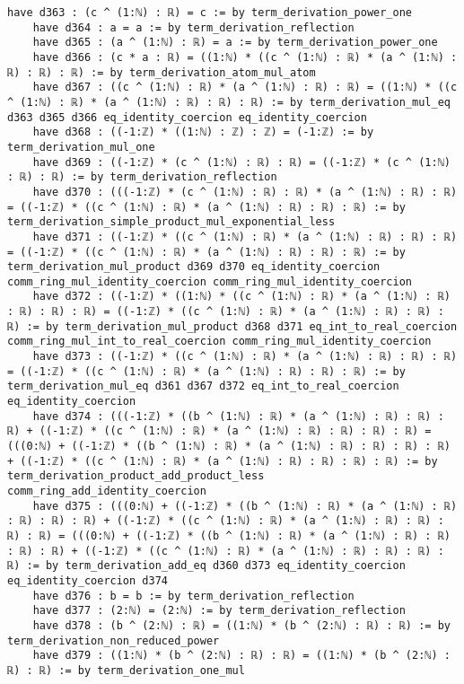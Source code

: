 \documentclass{article}
\begin{document}
\begin{tcolorbox}[colback=white!10, width=\linewidth]
\begin{lstlisting}[language=Lean4]
    have d363 : (c ^ (1:ℕ) : ℝ) = c := by term_derivation_power_one
    have d364 : a = a := by term_derivation_reflection
    have d365 : (a ^ (1:ℕ) : ℝ) = a := by term_derivation_power_one
    have d366 : (c * a : ℝ) = ((1:ℕ) * ((c ^ (1:ℕ) : ℝ) * (a ^ (1:ℕ) : ℝ) : ℝ) : ℝ) := by term_derivation_atom_mul_atom
    have d367 : ((c ^ (1:ℕ) : ℝ) * (a ^ (1:ℕ) : ℝ) : ℝ) = ((1:ℕ) * ((c ^ (1:ℕ) : ℝ) * (a ^ (1:ℕ) : ℝ) : ℝ) : ℝ) := by term_derivation_mul_eq d363 d365 d366 eq_identity_coercion eq_identity_coercion
    have d368 : ((-1:ℤ) * ((1:ℕ) : ℤ) : ℤ) = (-1:ℤ) := by term_derivation_mul_one
    have d369 : ((-1:ℤ) * (c ^ (1:ℕ) : ℝ) : ℝ) = ((-1:ℤ) * (c ^ (1:ℕ) : ℝ) : ℝ) := by term_derivation_reflection
    have d370 : (((-1:ℤ) * (c ^ (1:ℕ) : ℝ) : ℝ) * (a ^ (1:ℕ) : ℝ) : ℝ) = ((-1:ℤ) * ((c ^ (1:ℕ) : ℝ) * (a ^ (1:ℕ) : ℝ) : ℝ) : ℝ) := by term_derivation_simple_product_mul_exponential_less
    have d371 : ((-1:ℤ) * ((c ^ (1:ℕ) : ℝ) * (a ^ (1:ℕ) : ℝ) : ℝ) : ℝ) = ((-1:ℤ) * ((c ^ (1:ℕ) : ℝ) * (a ^ (1:ℕ) : ℝ) : ℝ) : ℝ) := by term_derivation_mul_product d369 d370 eq_identity_coercion comm_ring_mul_identity_coercion comm_ring_mul_identity_coercion
    have d372 : ((-1:ℤ) * ((1:ℕ) * ((c ^ (1:ℕ) : ℝ) * (a ^ (1:ℕ) : ℝ) : ℝ) : ℝ) : ℝ) = ((-1:ℤ) * ((c ^ (1:ℕ) : ℝ) * (a ^ (1:ℕ) : ℝ) : ℝ) : ℝ) := by term_derivation_mul_product d368 d371 eq_int_to_real_coercion comm_ring_mul_int_to_real_coercion comm_ring_mul_identity_coercion
    have d373 : ((-1:ℤ) * ((c ^ (1:ℕ) : ℝ) * (a ^ (1:ℕ) : ℝ) : ℝ) : ℝ) = ((-1:ℤ) * ((c ^ (1:ℕ) : ℝ) * (a ^ (1:ℕ) : ℝ) : ℝ) : ℝ) := by term_derivation_mul_eq d361 d367 d372 eq_int_to_real_coercion eq_identity_coercion
    have d374 : (((-1:ℤ) * ((b ^ (1:ℕ) : ℝ) * (a ^ (1:ℕ) : ℝ) : ℝ) : ℝ) + ((-1:ℤ) * ((c ^ (1:ℕ) : ℝ) * (a ^ (1:ℕ) : ℝ) : ℝ) : ℝ) : ℝ) = (((0:ℕ) + ((-1:ℤ) * ((b ^ (1:ℕ) : ℝ) * (a ^ (1:ℕ) : ℝ) : ℝ) : ℝ) : ℝ) + ((-1:ℤ) * ((c ^ (1:ℕ) : ℝ) * (a ^ (1:ℕ) : ℝ) : ℝ) : ℝ) : ℝ) := by term_derivation_product_add_product_less comm_ring_add_identity_coercion
    have d375 : (((0:ℕ) + ((-1:ℤ) * ((b ^ (1:ℕ) : ℝ) * (a ^ (1:ℕ) : ℝ) : ℝ) : ℝ) : ℝ) + ((-1:ℤ) * ((c ^ (1:ℕ) : ℝ) * (a ^ (1:ℕ) : ℝ) : ℝ) : ℝ) : ℝ) = (((0:ℕ) + ((-1:ℤ) * ((b ^ (1:ℕ) : ℝ) * (a ^ (1:ℕ) : ℝ) : ℝ) : ℝ) : ℝ) + ((-1:ℤ) * ((c ^ (1:ℕ) : ℝ) * (a ^ (1:ℕ) : ℝ) : ℝ) : ℝ) : ℝ) := by term_derivation_add_eq d360 d373 eq_identity_coercion eq_identity_coercion d374
    have d376 : b = b := by term_derivation_reflection
    have d377 : (2:ℕ) = (2:ℕ) := by term_derivation_reflection
    have d378 : (b ^ (2:ℕ) : ℝ) = ((1:ℕ) * (b ^ (2:ℕ) : ℝ) : ℝ) := by term_derivation_non_reduced_power
    have d379 : ((1:ℕ) * (b ^ (2:ℕ) : ℝ) : ℝ) = ((1:ℕ) * (b ^ (2:ℕ) : ℝ) : ℝ) := by term_derivation_one_mul

\end{lstlisting}
\end{tcolorbox}
\end{document}
